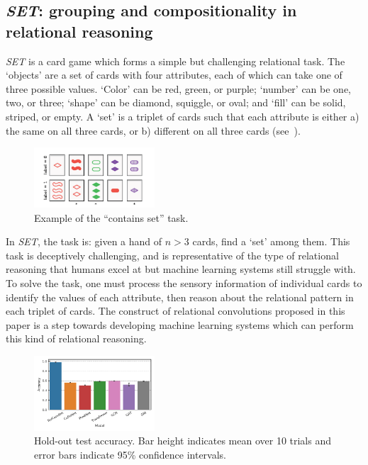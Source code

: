 \subsection{\textit{SET}: grouping and compositionality in relational reasoning}\label{ssec:experiments_set}

\textit{SET} is a card game which forms a simple but challenging relational task. The `objects' are a set of cards with four attributes, each of which can take one of three possible values. `Color' can be red, green, or purple; `number' can be one, two, or three; `shape' can be diamond, squiggle, or oval; and `fill' can be solid, striped, or empty. A `set' is a triplet of cards such that each attribute is either a) the same on all three cards, or b) different on all three cards (see~).

\begin{figure}[ht]
    \centering
    \includegraphics[width=0.4\textwidth]{figs/contains_set_example.pdf}
    \vskip-12pt
    \caption{Example of the ``contains set'' task.}\label{fig:contains_set_example}
    \vskip-7pt
\end{figure}

In \textit{SET}, the task is: given a hand of $n > 3$ cards, find a `set' among them. 
This task is deceptively challenging, and is representative of the type of relational reasoning that humans excel at but machine learning systems still struggle with. To solve the task, one must process the sensory information of individual cards to identify the values of each attribute, then reason about the relational pattern in each triplet of cards.
The construct of relational convolutions proposed in this paper is a step towards developing machine learning systems which can perform this kind of relational reasoning.

\begin{figure}[ht]
    \centering
    \includegraphics[width=0.4\textwidth]{figs/experiments/contains_set_acc.pdf}
    \vskip-12pt
    \caption{Hold-out test accuracy. Bar height indicates mean over 10 trials and error bars indicate 95\% confidence intervals.}\label{fig:contains_set_acc}
    \vskip-5pt
\end{figure}

